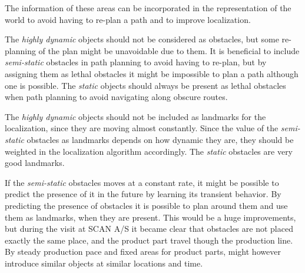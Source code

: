 The information of these areas can be incorporated in the representation of the world to avoid having to re-plan a path and to improve localization. 

The \textit{highly dynamic} objects should not be considered as obstacles, but some re-planning of the plan might be unavoidable due to them. 
It is beneficial to include \textit{semi-static} obstacles in path planning to avoid having to re-plan, but by assigning them as lethal obstacles it might be impossible to plan a path although one is possible.
The \textit{static} objects should always be present as lethal obstacles when path planning to avoid navigating along obscure routes.

The \textit{highly dynamic} objects should not be included as landmarks for the localization, since they are moving almost constantly. 
Since the value of the \textit{semi-static} obstacles as landmarks depends on how dynamic they are, they should be weighted in the localization algorithm accordingly. 
The \textit{static} obstacles are very good landmarks.

If the \textit{semi-static} obstacles moves at a constant rate, it might be possible to predict the presence of it in the future by learning its transient behavior.
By predicting the presence of obstacles it is possible to plan around them and use them as landmarks, when they are present.
This would be a huge improvements, but during the visit at SCAN A/S it became clear that obstacles are not placed exactly the same place, and the product part travel though the production line.
By steady production pace and fixed areas for product parts, might however introduce similar objects at similar locations and time.